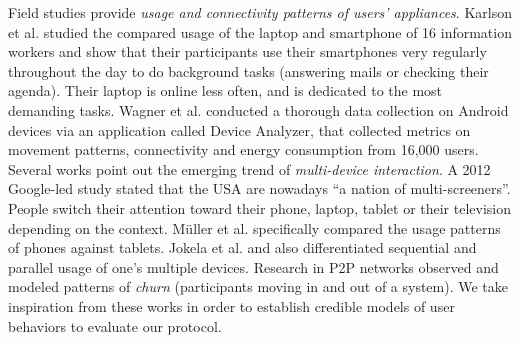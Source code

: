 
Field studies provide \emph{usage and connectivity patterns of users' appliances}. Karlson et al. \cite{Karlson_Meyers_Jacobs_Johns_Kane_2009} studied the compared usage of the laptop and smartphone of 16 information workers and show that their participants use their smartphones very regularly throughout the day to do background tasks (\eg answering mails or checking their agenda). Their laptop is online less often, and is dedicated to the most demanding tasks. Wagner et al. \cite{Wagner_Rice_Beresford_2013} conducted a thorough data collection on Android devices via an application called Device Analyzer, that collected metrics on movement patterns, connectivity and energy consumption from 16,000 users.
Several works point out the emerging trend of \emph{multi-device interaction}.
A 2012 Google-led study \cite{google2012} stated that the USA are nowadays ``a nation of multi-screeners''. People switch their attention toward their phone, laptop, tablet or their television depending on the context.
M\"uller et al. \cite{Muller_Gove_Webb_Cheang_2015} specifically compared the usage patterns of phones against tablets.
Jokela et al. \cite{Jokela_Ojala_Olsson_2015} and \cite{google2012} also differentiated sequential and parallel usage of one's multiple devices.
Research in P2P networks observed \cite{Stutzbach_Rejaie_2006} and modeled \cite{Yao_Leonard_Wang_Loguinov_2006} patterns of \emph{churn} (\ie participants moving in and out of a system).
We take inspiration from these works in order to establish credible models of user behaviors to evaluate our protocol. 


